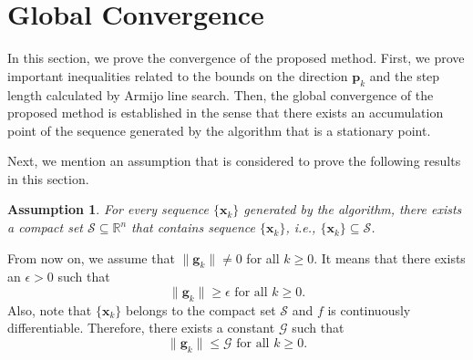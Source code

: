 \documentclass{elsarticle}
\newtheorem{assumption}{Assumption}
\numberwithin{equation}{section}
\begin{document}
{\section{Global Convergence}
In this section, we prove the convergence of the proposed method.  First, we prove important inequalities related to the bounds on the direction $\mathbf{p}_{k}$ and the step length calculated by Armijo line search. Then, the global convergence of the proposed method is established in the sense that there exists an accumulation point of the sequence generated by the algorithm that is a stationary point.

Next, we mention an assumption that is considered to prove the following results in this section.
 


\begin{assumption}
    For every sequence $\{\mathbf{x}_{k}\}$ generated by the algorithm, there exists a compact set $\mathcal{S}\subseteq\mathbb{R}^{n}$ that contains sequence $\{\mathbf{x}_{k}\}$, i.e., $\{\mathbf{x}_{k}\}\subseteq\mathcal{S}$.
\end{assumption}
    From now on, we assume that $\lVert \mathbf{g}_k\rVert \neq 0$ for all $k\geq0$. It means that there exists an $\epsilon>0$ such that 
\begin{equation}\label{normgklessepsilon}
\lVert \mathbf{g}_k\rVert \geq\epsilon \text{ for all } k\geq0.
\end{equation}
Also, note that $\{\mathbf{x}_{k}\}$ belongs to the compact set $\mathcal{S}$ and $f$ is continuously differentiable. Therefore, there exists a  constant $\mathcal{G}$ such that
\begin{equation}\label{normgklessG}
\lVert \mathbf{g}_k\rVert \leq \mathcal{G} \text{ for all } k\geq0.
\end{equation}





}
\end{document}
